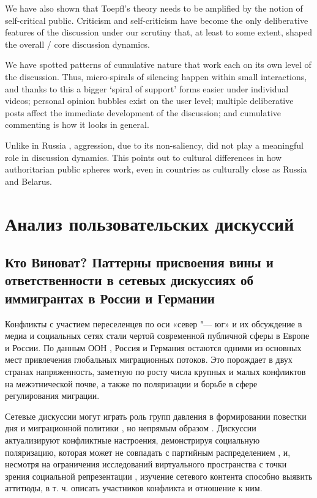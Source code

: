 We have also shown that Toepfl’s theory \cite{Toepfl} needs to be amplified by the notion of self-critical public. Criticism and self-criticism have become the only deliberative features of the discussion under our scrutiny that, at least to some extent, shaped the overall / core discussion dynamics.

We have spotted patterns of cumulative nature that work each on its own level of the discussion. Thus, micro-spirals of silencing happen within small interactions, and thanks to this a bigger ‘spiral of support’ forms easier under individual videos; personal opinion bubbles exist on the user level; multiple deliberative posts affect the immediate development of the discussion; and cumulative commenting is how it looks in general.

Unlike in Russia \cite{BodrunovaLitvinenkoBlekanov2021}, aggression, due to its non-saliency, did not play a meaningful role in discussion dynamics. This points out to cultural differences in how authoritarian public spheres work, even in countries as culturally close as Russia and Belarus.

\section{Анализ пользовательских дискуссий}\label{sec:ch2/sec5}

\subsection{Кто Виноват? Паттерны присвоения вины и ответственности в сетевых дискуссиях об иммигрантах в России и Германии}\label{subsec:ch2/sec5/sub1}

Конфликты с участием переселенцев по оси «север "--- юг» и их обсуждение в медиа и социальных сетях стали чертой современной публичной сферы в Европе и России. По данным ООН \cite{UN2013}, Россия и Германия остаются одними из основных мест привлечения глобальных миграционных потоков. Это порождает в двух странах напряженность, заметную по росту числа крупных и малых конфликтов на межэтнической почве, а также по поляризации и борьбе в сфере регулирования миграции.

Сетевые дискуссии могут играть роль групп давления в формировании повестки дня и миграционной политики \cite{TrottierFuchs}, но непрямым образом \cite{Tufekci}. Дискуссии актуализируют конфликтные настроения, демонстрируя социальную поляризацию, которая может не совпадать с партийным распределением \cite{BodrunovaBlekanovSmoliarova}, и, несмотря на ограничения исследований виртуального пространства с точки зрения социальной репрезентации \cite{Daniels}, изучение сетевого контента способно выявить аттитюды, в т. ч. описать участников конфликта и отношение к ним.

